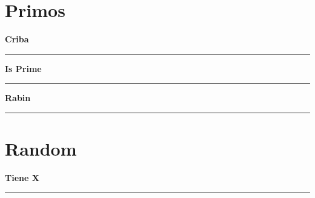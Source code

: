 \documentclass[a4paper, 12pt]{article}
\begin{document}
	\section{Primos}
	    \begin{center}{\Large\bf Criba}\\\noindent\rule{8cm}{0.4pt}\end{center}
		
		\begin{center}{\Large\bf Is Prime}\\\noindent\rule{8cm}{0.4pt}\end{center}
		
		\begin{center}{\Large\bf Rabin}\\\noindent\rule{8cm}{0.4pt}\end{center}
		
		\newpage
	\section{Random}
	    \begin{center}{\Large\bf Tiene X}\\\noindent\rule{8cm}{0.4pt}\end{center}
		
\end{document}
